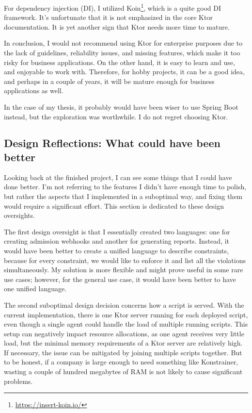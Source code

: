 For dependency injection (DI), I utilized Koin\footnote{\url{https://insert-koin.io/}}, which is a quite good DI framework. It's unfortunate that it is not emphasized in the core Ktor documentation. It is yet another sign that Ktor needs more time to mature.

In conclusion, I would not recommend using Ktor for enterprise purposes due to the lack of guidelines, reliability issues, and missing features, which make it too risky for business applications. On the other hand, it is easy to learn and use, and enjoyable to work with. Therefore, for hobby projects, it can be a good idea, and perhaps in a couple of years, it will be mature enough for business applications as well.

In the case of my thesis, it probably would have been wiser to use Spring Boot instead, but the exploration was worthwhile. I do not regret choosing Ktor.

\subsection[Design Reflections]{Design Reflections: What could have been better}

Looking back at the finished project, I can see some things that I could have done better. I'm not referring to the features I didn't have enough time to polish, but rather the aspects that I implemented in a suboptimal way, and fixing them would require a significant effort. This section is dedicated to these design oversights.

The first design oversight is that I essentially created two languages: one for creating admission webhooks and another for generating reports. Instead, it would have been better to create a unified language to describe constraints, because for every constraint, we would like to enforce it and list all the violations simultaneously. My solution is more flexible and might prove useful in some rare use cases; however, for the general use case, it would have been better to have one unified language.

The second suboptimal design decision concerns how a script is served. With the current implementation, there is one Ktor server running for each deployed script, even though a single agent could handle the load of multiple running scripts. This setup can negatively impact resource allocations, as one agent receives very little load, but the minimal memory requirements of a Ktor server are relatively high. If necessary, the issue can be mitigated by joining multiple scripts together. But to be honest, if a company is large enough to need something like Konstrainer, wasting a couple of hundred megabytes of RAM is not likely to cause significant problems.

